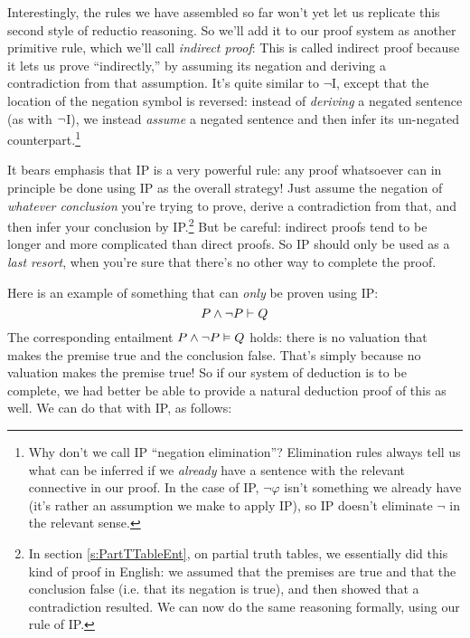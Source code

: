 Interestingly, the rules we have assembled so far won't yet let us replicate this second style of reductio reasoning.  So we'll add it to our proof system as another primitive rule, which we'll call \emph{indirect proof}:
This is called indirect proof because it lets us prove \meta{\varphi} ``indirectly,'' by assuming its negation and deriving a contradiction from that assumption. It's quite similar to $\lnot$I, except that the location of the negation symbol is reversed: instead of \emph{deriving} a negated sentence (as with $\neg$I), we instead \emph{assume} a negated sentence and then infer its un-negated counterpart.\footnote{Why don't we call IP ``negation elimination''?  Elimination rules always tell us what can be inferred if we \emph{already} have a sentence with the relevant connective in our proof.  In the case of IP, $\lnot \varphi$ isn't something we already have (it's rather an assumption we make to apply IP), so IP doesn't eliminate $\lnot$ in the relevant sense.}

It bears emphasis that IP is a very powerful rule: any proof whatsoever can in principle be done using IP as the overall strategy!  Just assume the negation of \emph{whatever conclusion} you're trying to prove, derive a contradiction from that, and then infer your conclusion by IP.\footnote{In section \ref{s:PartTTableEnt}, on partial truth tables, we essentially did this kind of proof in English: we assumed that the premises are true and  that the conclusion false (i.e. that its negation  is true), and then showed that a contradiction resulted.  We can now do the same reasoning formally, using our rule of IP.}  But be careful: indirect proofs tend to be longer and more complicated than direct proofs.  So IP should only be used as a \emph{last resort}, when you're sure that there's no other way to complete the proof.

Here is an example of something that can \emph{only} be proven using IP:
$$P \wedge \neg P \vdash Q$$
The corresponding entailment $P \wedge \neg P \vDash Q$ holds: there is no valuation that makes the premise true and the conclusion false.  That's simply because no valuation makes the premise true!  So if our system of deduction is to be complete, we had better be able to provide a natural deduction proof of this as well.  We can do that with IP, as follows:\\

